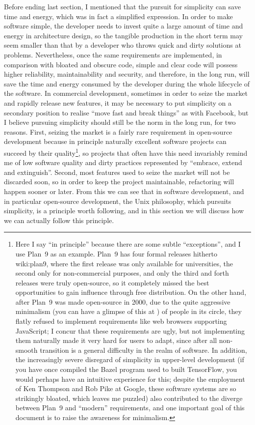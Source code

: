 Before ending last section, I mentioned that the pursuit for simplicity can
save time and energy, which was in fact a simplified expression.  In order to
make software simple, the developer needs to invest quite a large amount of time
and energy in architecture design, so the tangible production in the short term
may seem smaller than that by a developer who throws quick and dirty solutions
at problems.  Nevertheless, once the same requirements are implemented, in
comparison with bloated and obscure code, simple and clear code will possess
higher reliability, maintainability and security, and therefore, in the long
run, will save the time and energy consumed by the developer during the whole
lifecycle of the software.  In commercial development, sometimes in order to
seize the market and rapidly release new features, it may be necessary to put
simplicity on a secondary position to realise ``move fast and break things''
as with Facebook, but I believe pursuing simplicity should still be the norm
in the long run, for two reasons.  First, seizing the market is a fairly rare
requirement in open-source development because in principle naturally excellent
software projects can succeed by their quality\footnote{\label{fn:plan9}Here
I say ``in principle'' because there are some subtle ``exceptions'', and I use
Plan~9 as an example.  Plan~9 has four formal releases hitherto\cupercite%
{wiki:plan9}, where the first release was only available for universities, the
second only for non-commercial purposes, and only the third and forth releases
were truly open-source, so it completely missed the best opportunities to gain
influence through free distribution.  On the other hand, after Plan~9 was made
open-source in 2000, due to the quite aggressive minimalism (you can have a
glimpse of this at \parencite{catv:hsoft}) of people in its circle, they flatly
refused to implement requirements like web browsers supporting JavaScript; I
concur that these requirements are ugly, but not implementing them naturally
made it very hard for users to adapt, since after all non-smooth transition is
a general difficulty in the realm of software.  In addition, the increasingly
severe disregard of simplicity in upper-level development (if you have once
compiled the Bazel program used to built TensorFlow, you would perhaps have an
intuitive experience for this; despite the employment of Ken Thompson and Rob
Pike \etal{} at Google, these software systems are so strikingly bloated, which
leaves me puzzled) also contributed to the diverge between Plan~9 and ``modern''
requirements, and one important goal of this document is to raise the awareness
for minimalism.}, so projects that often have this need invariably remind
me of low software quality and dirty practices represented by ``embrace,
extend and extinguish''.  Second, most features used to seize the market
will not be discarded soon, so in order to keep the project maintainable,
refactoring will happen sooner or later.  From this we can see that in software
development, and in particular open-source development, the Unix philosophy,
which pursuits simplicity, is a principle worth following, and in this
section we will discuss how we can actually follow this principle.

